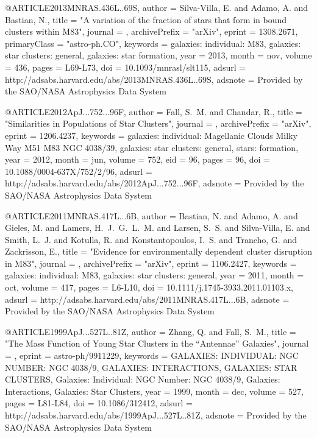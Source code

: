 {{{@ARTICLE{2013MNRAS.436L..69S,
   author = {{Silva-Villa}, E. and {Adamo}, A. and {Bastian}, N.},
    title = "{A variation of the fraction of stars that form in bound clusters within M83}",
  journal = {\mnras},
archivePrefix = "arXiv",
   eprint = {1308.2671},
 primaryClass = "astro-ph.CO",
 keywords = {galaxies: individual: M83, galaxies: star clusters: general, galaxies: star formation},
     year = 2013,
    month = nov,
   volume = 436,
    pages = {L69-L73},
      doi = {10.1093/mnrasl/slt115},
   adsurl = {http://adsabs.harvard.edu/abs/2013MNRAS.436L..69S},
  adsnote = {Provided by the SAO/NASA Astrophysics Data System}
}

@ARTICLE{2012ApJ...752...96F,
   author = {{Fall}, S.~M. and {Chandar}, R.},
    title = "{Similarities in Populations of Star Clusters}",
  journal = {\apj},
archivePrefix = "arXiv",
   eprint = {1206.4237},
 keywords = {galaxies: individual: Magellanic Clouds Milky Way M51 M83 NGC 4038/39, galaxies: star clusters: general, stars: formation},
     year = 2012,
    month = jun,
   volume = 752,
      eid = {96},
    pages = {96},
      doi = {10.1088/0004-637X/752/2/96},
   adsurl = {http://adsabs.harvard.edu/abs/2012ApJ...752...96F},
  adsnote = {Provided by the SAO/NASA Astrophysics Data System}
}

@ARTICLE{2011MNRAS.417L...6B,
   author = {{Bastian}, N. and {Adamo}, A. and {Gieles}, M. and {Lamers}, H.~J.~G.~L.~M. and 
	{Larsen}, S.~S. and {Silva-Villa}, E. and {Smith}, L.~J. and 
	{Kotulla}, R. and {Konstantopoulos}, I.~S. and {Trancho}, G. and 
	{Zackrisson}, E.},
    title = "{Evidence for environmentally dependent cluster disruption in M83}",
  journal = {\mnras},
archivePrefix = "arXiv",
   eprint = {1106.2427},
 keywords = {galaxies: individual: M83, galaxies: star clusters: general},
     year = 2011,
    month = oct,
   volume = 417,
    pages = {L6-L10},
      doi = {10.1111/j.1745-3933.2011.01103.x},
   adsurl = {http://adsabs.harvard.edu/abs/2011MNRAS.417L...6B},
  adsnote = {Provided by the SAO/NASA Astrophysics Data System}
}

@ARTICLE{1999ApJ...527L..81Z,
   author = {{Zhang}, Q. and {Fall}, S.~M.},
    title = "{The Mass Function of Young Star Clusters in the ``Antennae'' Galaxies}",
  journal = {\apjl},
   eprint = {astro-ph/9911229},
 keywords = {GALAXIES: INDIVIDUAL: NGC NUMBER: NGC 4038/9, GALAXIES: INTERACTIONS, GALAXIES: STAR CLUSTERS, Galaxies: Individual: NGC Number: NGC 4038/9, Galaxies: Interactions, Galaxies: Star Clusters},
     year = 1999,
    month = dec,
   volume = 527,
    pages = {L81-L84},
      doi = {10.1086/312412},
   adsurl = {http://adsabs.harvard.edu/abs/1999ApJ...527L..81Z},
  adsnote = {Provided by the SAO/NASA Astrophysics Data System}
}

}}}
